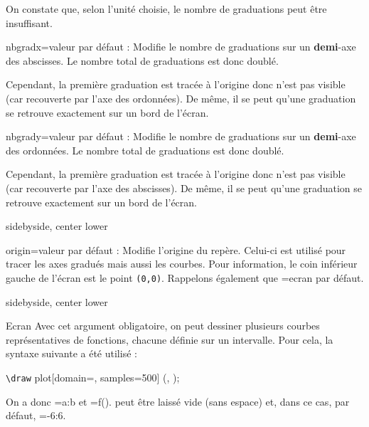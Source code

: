 \documentclass[10pt,french,a4paper]{article}
\begin{document}
On constate que, selon l'unité choisie, le nombre de graduations peut être insuffisant.

\begin{docKey}{nbgradx}{=}{valeur par défaut : }
    Modifie le nombre de graduations sur un \textbf{demi}-axe des abscisses. Le nombre total de graduations est donc doublé.\par
    Cependant, la première graduation est tracée à l'origine donc n'est pas visible (car recouverte par l'axe des ordonnées). De même, il se peut qu'une graduation se retrouve exactement sur un bord de l'écran.
\end{docKey}

\begin{docKey}{nbgrady}{=}{valeur par défaut : }
    Modifie le nombre de graduations sur un \textbf{demi}-axe des ordonnées. Le nombre total de graduations est donc doublé.\par
    Cependant, la première graduation est tracée à l'origine donc n'est pas visible (car recouverte par l'axe des abscisses). De même, il se peut qu'une graduation se retrouve exactement sur un bord de l'écran.
\end{docKey}

\begin{dispExample*}{sidebyside, center lower}
\Ecran[width=6, height=4, graphic=true, xgrad=0.25, nbgradx=13, ygrad=1, nbgrady=40]{}
\end{dispExample*}

\begin{docKey}{origin}{=}{valeur par défaut : }
    Modifie l'origine du repère. Celui-ci est utilisé pour tracer les axes gradués mais aussi les courbes. Pour information, le coin inférieur gauche de l'écran est le point \texttt{(0,0)}. Rappelons également que {\ttfamily {}=ecran} par défaut.
\end{docKey}

\begin{dispExample*}{sidebyside, center lower}
\Ecran[width=6, height=4, graphic=true, origin={(1,1)}, nbgradx=10, nbgrady=6]{}
\end{dispExample*}

\begin{docCommand}{Ecran}{}
    Avec cet argument obligatoire, on peut dessiner plusieurs courbes représentatives de fonctions, chacune définie sur un intervalle. Pour cela, la syntaxe suivante a été utilisé :
    \begin{center}
        \ttfamily
        \verb!\draw! plot[domain=, samples=500] (\string\x, );
    \end{center}

    On a donc {\ttfamily {}=a:b} et {\ttfamily {}=f(\string\x)}.  peut être laissé vide (sans espace) et, dans ce cas, par défaut, {\ttfamily{}=-6:6}.
\end{docCommand}
\end{document}
